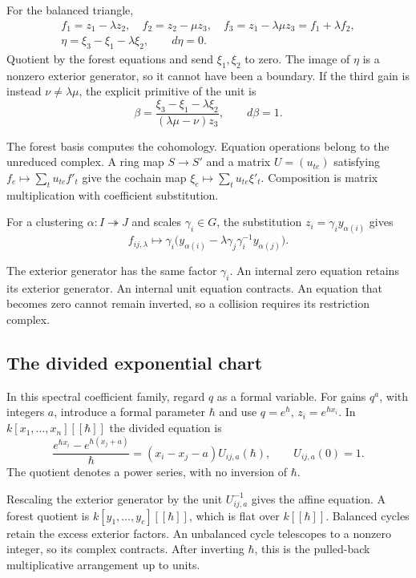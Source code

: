 For the balanced triangle,
\begin{equation}\label{v4-arith:curve:eq:gain-triangle}
 \begin{gathered}
 f_1=z_1-\lambda z_2,\quad f_2=z_2-\mu z_3,\quad
 f_3=z_1-\lambda\mu z_3=f_1+\lambda f_2,\\
 \eta=\xi_3-\xi_1-\lambda\xi_2,\qquad d\eta=0.
 \end{gathered}
\end{equation}
Quotient by the forest equations and send $\xi_1,\xi_2$ to zero.
The image of $\eta$ is a nonzero exterior generator, so it cannot
have been a boundary. If the third gain is instead $\nu\ne\lambda\mu$,
the explicit primitive of the unit is
\[
 \beta=\frac{\xi_3-\xi_1-\lambda\xi_2}{(\lambda\mu-\nu)z_3},
 \qquad d\beta=1.
\]

The forest basis computes the cohomology. Equation operations
belong to the unreduced complex. A ring map $S\to S'$ and a
matrix $U=(u_{te})$ satisfying
$f_e\mapsto\sum_tu_{te}f'_t$ give the cochain map
$\xi_e\mapsto\sum_tu_{te}\xi'_t$. Composition is matrix
multiplication with coefficient substitution.

For a clustering $\alpha:I\twoheadrightarrow J$ and scales
$\gamma_i\in G$, the substitution $z_i=\gamma_i y_{\alpha(i)}$ gives
\[
 f_{ij,\lambda}\longmapsto
 \gamma_i\bigl(y_{\alpha(i)}
       -\lambda\gamma_j\gamma_i^{-1}y_{\alpha(j)}\bigr).
\]

The exterior generator has the same factor $\gamma_i$.
An internal zero equation retains its exterior generator.
An internal unit equation contracts. An equation that becomes
zero cannot remain inverted, so a collision requires its
restriction complex.

\subsection{The divided exponential chart}

In this spectral coefficient family, regard $q$ as a formal variable.
For gains $q^a$, with integers $a$, introduce a formal parameter
$\hbar$ and use $q=e^\hbar$, $z_i=e^{\hbar x_i}$.
In $k[x_1,\ldots,x_n][[\hbar]]$ the divided equation is
\[
 \frac{e^{\hbar x_i}-e^{\hbar(x_j+a)}}{\hbar}
 =(x_i-x_j-a)U_{ij,a}(\hbar),\qquad U_{ij,a}(0)=1.
\]
The quotient denotes a power series, with no inversion of $\hbar$.

Rescaling the exterior generator by the unit $U_{ij,a}^{-1}$
gives the affine equation. A forest quotient is
$k[y_1,\ldots,y_c][[\hbar]]$, which is flat over $k[[\hbar]]$.
Balanced cycles retain the excess exterior factors. An unbalanced
cycle telescopes to a nonzero integer, so its complex contracts.
After inverting $\hbar$, this is the pulled-back multiplicative
arrangement up to units.

